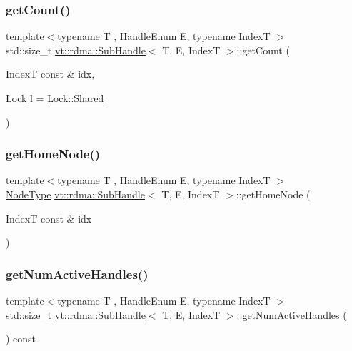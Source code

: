 \subsubsection{\texorpdfstring{get\+Count()}{getCount()}}
{\footnotesize\ttfamily template$<$typename T , Handle\+Enum E, typename IndexT $>$ \\
std\+::size\+\_\+t \hyperlink{structvt_1_1rdma_1_1_sub_handle}{vt\+::rdma\+::\+Sub\+Handle}$<$ T, E, IndexT $>$\+::get\+Count (\begin{DoxyParamCaption}\item[{IndexT const \&}]{idx,  }\item[{\hyperlink{namespacevt_1_1rdma_ac5c20b41a653e520b6305d4d454ecb70}{Lock}}]{l = {\ttfamily \hyperlink{namespacevt_1_1rdma_ac5c20b41a653e520b6305d4d454ecb70aa6156ea9d66fef24e87e841fbabf7cca}{Lock\+::\+Shared}} }\end{DoxyParamCaption})}

\mbox{\label{structvt_1_1rdma_1_1_sub_handle_ae94fc60f536d4248f76d86bf60bdc21b}} 
\subsubsection{\texorpdfstring{get\+Home\+Node()}{getHomeNode()}}
{\footnotesize\ttfamily template$<$typename T , Handle\+Enum E, typename IndexT $>$ \\
\hyperlink{namespacevt_a866da9d0efc19c0a1ce79e9e492f47e2}{Node\+Type} \hyperlink{structvt_1_1rdma_1_1_sub_handle}{vt\+::rdma\+::\+Sub\+Handle}$<$ T, E, IndexT $>$\+::get\+Home\+Node (\begin{DoxyParamCaption}\item[{IndexT const \&}]{idx }\end{DoxyParamCaption})}

\mbox{\label{structvt_1_1rdma_1_1_sub_handle_a4e1632734958542eb211fb462e54eebb}} 
\subsubsection{\texorpdfstring{get\+Num\+Active\+Handles()}{getNumActiveHandles()}}
{\footnotesize\ttfamily template$<$typename T , Handle\+Enum E, typename IndexT $>$ \\
std\+::size\+\_\+t \hyperlink{structvt_1_1rdma_1_1_sub_handle}{vt\+::rdma\+::\+Sub\+Handle}$<$ T, E, IndexT $>$\+::get\+Num\+Active\+Handles (\begin{DoxyParamCaption}{ }\end{DoxyParamCaption}) const}

